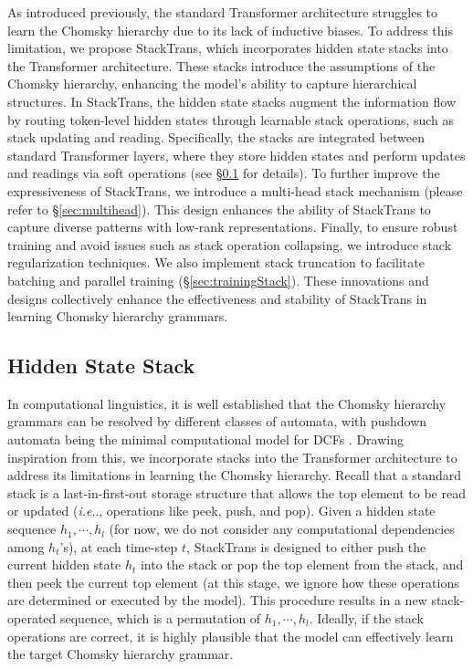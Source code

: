 \documentclass{article}
\makeatletter
\DeclareRobustCommand\onedot{\futurelet\@let@token\@onedot}
\def\@onedot{\ifx\@let@token.\else.\null\fi\xspace}
\def\ie{\emph{i.e}\onedot} \def\Ie{\emph{I.e}\onedot}
\DeclareRobustCommand{\method}{{\sc StackTrans}\xspace}
\makeatother
\begin{document}
As introduced previously, the standard Transformer architecture \citep{vaswani2017attention} struggles to learn the Chomsky hierarchy due to its lack of inductive biases.
To address this limitation, we propose \method, which incorporates hidden state stacks into the Transformer architecture. 
These stacks introduce the assumptions of the Chomsky hierarchy, enhancing the model's ability to capture hierarchical structures.
In \method, the hidden state stacks augment the information flow by routing token-level hidden states through learnable stack operations, such as stack updating and reading. 
Specifically, the stacks are integrated between standard Transformer layers, where they store hidden states and perform updates and readings via soft operations (see \S\ref{sec:methodStack} for details).
To further improve the expressiveness of \method, we introduce a multi-head stack mechanism (please refer to \S\ref{sec:multihead}). This design enhances the ability of \method to capture diverse patterns with low-rank representations. 
Finally, to ensure robust training and avoid issues such as stack operation collapsing, we introduce stack regularization techniques. We also implement stack truncation to facilitate batching and parallel training (\S\ref{sec:trainingStack}). 
These innovations and designs collectively enhance the effectiveness and stability of \method in learning Chomsky hierarchy grammars.




\subsection{Hidden State Stack}
\label{sec:methodStack}

In computational linguistics, it is well established that the Chomsky hierarchy grammars can be resolved by different classes of automata, with pushdown automata being the minimal computational model for DCFs \citep{chomsky1959algebraic}. Drawing inspiration from this, we incorporate stacks into the Transformer architecture to address its limitations in learning the Chomsky hierarchy.
Recall that a standard stack is a last-in-first-out storage structure that allows the top element to be read or updated (\ie, operations like peek, push, and pop).
Given a hidden state sequence $h_1,\cdots,h_l$ (for now, we do not consider any computational dependencies among $h_t$'s), at each time-step $t$, \method is designed to either push the current hidden state $h_t$ into the stack or pop the top element from the stack, and then peek the current top element (at this stage, we ignore how these operations are determined or executed by the model).
This procedure results in a new stack-operated sequence, which is a permutation of $h_1,\cdots,h_l$.
Ideally, if the stack operations are correct, it is highly plausible that the model can effectively learn the target Chomsky hierarchy grammar.
\end{document}
